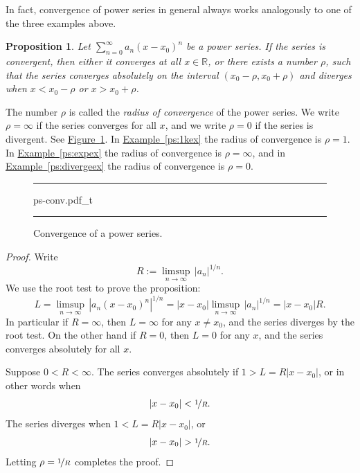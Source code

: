 \documentclass[12pt]{book}
\newenvironment{myfigureht}{%
\begin{figure}[h!t]
\noindent\rule{\textwidth}{0.4pt}\vspace{12pt}\par\centering}%
{\par\noindent\rule{\textwidth}{0.4pt}
\end{figure}}
\newcommand{\abs}[1]{\left\lvert {#1} \right\rvert}
\newcommand{\R}{{\mathbb{R}}}
\newcommand{\myindex}[1]{#1\index{#1}}
\theoremstyle{plain}
\newtheorem{prop}[thm]{Proposition}
\theoremstyle{remark}
\theoremstyle{definition}
\theoremstyle{exercise}
\theoremstyle{example}
\newcommand{\figureref}[1]{\hyperref[#1]{Figure~\ref*{#1}}}
\newcommand{\exampleref}[1]{\hyperref[#1]{Example~\ref*{#1}}}
\begin{document}
In fact, convergence of power series in general always works analogously to
one of the three examples above.

\begin{prop}
Let $\sum_{n=0}^\infty a_n {(x-x_0)}^n$ be a power series.
If the series is convergent, then either it converges at
all $x \in \R$, or
there exists a number $\rho$, such that
the series converges absolutely on the interval
$(x_0-\rho,x_0+\rho)$ and diverges when $x < x_0-\rho$ or $x > x_0+\rho$.
\end{prop}

The number $\rho$ is called the \emph{\myindex{radius of convergence}} of the
power series.  We write $\rho = \infty$ if the series converges for
all $x$, and we write $\rho = 0$ if the series is divergent.
See \figureref{ps:convfig}.
In \exampleref{ps:1kex}
the radius of convergence is $\rho=1$.
In \exampleref{ps:expex} the radius of convergence is $\rho=\infty$,
and in \exampleref{ps:divergeex} the radius of convergence is $\rho=0$.

\begin{myfigureht}
{ps-conv.pdf_t}
\caption{Convergence of a power series.\label{ps:convfig}}
\end{myfigureht}

\begin{proof}
Write
\begin{equation*}
R := \limsup_{n\to\infty} \, {\abs{a_n}}^{1/n} .
\end{equation*}
We use the root test to prove the proposition:
\begin{equation*}
L = \limsup_{n\to\infty} \, {\abs{a_n {(x-x_0)}^n}}^{1/n} 
=
\abs{x-x_0} \limsup_{n\to\infty} \, {\abs{a_n}}^{1/n}
=
\abs{x-x_0} R .
\end{equation*}
In particular if $R = \infty$, then $L=\infty$ for any $x \not= x_0$, and
the series diverges by the root test.  On the
other hand if $R = 0$, then $L=0$ for any $x$, and the series 
converges absolutely for all $x$.

Suppose $0 < R < \infty$.
The series
converges absolutely if
$1 > L = R \abs{x-x_0}$,
or in other words when
\begin{equation*}
\abs{x-x_0} < \nicefrac{1}{R} .
\end{equation*}
The series diverges when
$1 < L = R \abs{x-x_0}$,
or
\begin{equation*}
\abs{x-x_0} > \nicefrac{1}{R} .
\end{equation*}
Letting $\rho = \nicefrac{1}{R}$ completes the proof.
\end{proof}
\end{document}
